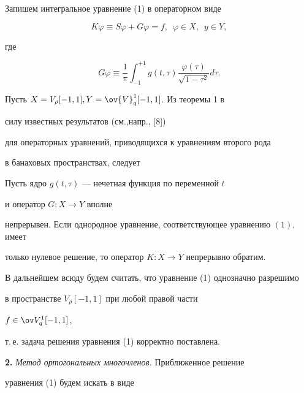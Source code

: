 Запишем интегральное уравнение (1) в операторном виде


$$


K\varphi\equiv S\varphi+G\varphi=f, \ \; \varphi \in X, \ \; y \in Y,


$$


где


$$


G\varphi\equiv \frac{1}{\pi}\int^{+1}_{-1}g(t,\tau)\frac{\varphi(\tau)}


{\sqrt{1-\tau^2}}d\tau.


$$





Пусть $X = V_{\rho}[-1,1], Y = \ov{V}_{q}^{1}[-1,1]$. Из теоремы 1 в


силу известных результатов (см.,\linebreak напр., [8])


для операторных уравнений, приводящихся к уравнениям второго рода


в банаховых пространствах, следует





\begin{thm}


Пусть ядро $g(t,\tau)$ --- нечетная функция по переменной $t$


и оператор $G: X \rightarrow Y$ вполне


непрерывен. Если однородное уравнение, соответствующее уравнению $(1)$, имеет


только нулевое решение, то оператор $K:X\rightarrow Y$ непрерывно обратим.


\end{thm}





В дальнейшем всюду будем считать, что уравнение (1) однозначно разрешимо


в пространстве $V_{\rho}[-1,1]$ при любой правой части


$f\in\ov V_{q}^{1}[-1,1]$,


т.\,е. задача решения уравнения (1) корректно поставлена.


\medskip





{\bf 2.} {\it Метод ортогональных многочленов.} Приближенное решение


уравнения (1) будем искать в виде


